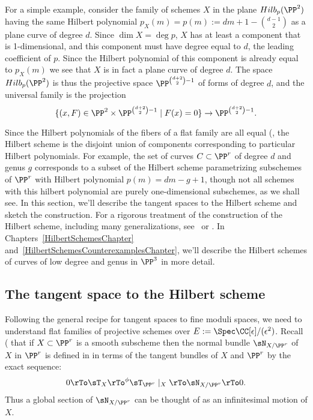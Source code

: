 \begin{example}\label{Hilb for plane curves}
 For a simple example, consider the family of schemes $X$ in the plane
$Hilb_p(\PP^2)$
having the same Hilbert polynomial $p_X(m)  = p(m) := dm+1-{d-1\choose 2}$ as a plane curve of degree $d$. Since 
$\dim X = \deg p$, $X$ has at least a component that is 1-dimensional, and this component must have degree
equal to $d$, the leading coefficient of $p$. Since the Hilbert polynomial  of this component is already equal
to $p_X(m)$ we see that $X$ is in fact a plane curve of degree $d$. The space $Hilb_{p}(\PP^2)$ is thus the projective space $\PP^{{d+2\choose 2}-1}$ of forms of degree $d$,
and the universal family is the projection 
$$
\{(x,F) \in \PP^2 \times \PP^{{d+2\choose 2}-1} \mid F(x) = 0\} \to \PP^{{d+2\choose 2}-1}.
$$
\end{example}
 
Since the Hilbert polynomials of the fibers of a flat family are all equal (\cite[Section III.9]{Hartshorne1977}, the Hilbert scheme is the disjoint union of components corresponding to particular Hilbert polynomials. For example, the set of curves $C \subset \PP^r$ of degree $d$ and genus $g$ corresponds to a subset of the Hilbert scheme parametrizing subschemes of $\PP^r$ with Hilbert polynomial $p(m) = dm - g + 1$, though not all schemes with this hilbert polynomial are purely one-dimensional subschemes, as we shall see. In this section, we'll describe
 the tangent spaces to the Hilbert scheme and sketch the construction. For a rigorous treatment of the construction of the Hilbert scheme, including many generalizations,  see~\cite{HomogHilbert} or \cite{MR2222646}. In Chapters~\ref{HilbertSchemesChapter} and~\ref{HilbertSchemesCounterexamplesChapter}, we'll describe  the Hilbert schemes of curves of low degree and genus in $\PP^3$ in more detail. 

\subsection{The tangent space to the Hilbert scheme}\label{tan hilbert section}

Following the general recipe for tangent spaces to fine moduli spaces, we need to understand flat families
of projective schemes over $E := \Spec \CC[\eps]/(\eps^2)$. Recall (\cite[p. 182]{Hartshorne1977} that if $X\subset \PP^r$ is a smooth subscheme then
 the normal bundle $\sN_{X/\PP^r}$ of $X$ in $\PP^r$ is defined in in terms of the tangent bundles
 of $X$ and $\PP^r$ by the exact sequence: 
$$
0\rTo \sT_X \rTo^{\phi} \sT_{\PP^r}\mid_X \rTo \sN_{X/\PP^r} \rTo 0.
$$
Thus a global section of 
$\sN_{X/\PP^r}$
can be thought of as an infinitesimal motion of $X$.

